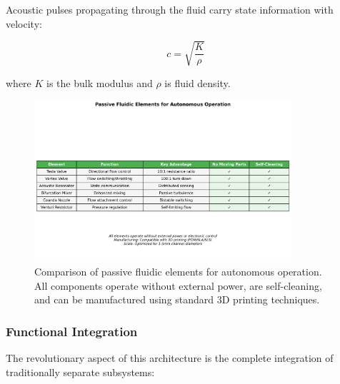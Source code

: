Acoustic pulses propagating through the fluid carry state information with velocity:

\begin{equation}
    c = \sqrt{\frac{K}{\rho}}
\end{equation}

where $K$ is the bulk modulus and $\rho$ is fluid density.

\begin{figure}[H]
    \centering
    \includegraphics[width=0.85\textwidth]{figures/simulations/fluidic_elements_table.png}
    \caption{Comparison of passive fluidic elements for autonomous operation. All components operate without external power, are self-cleaning, and can be manufactured using standard 3D printing techniques.}
    \label{fig:fluidic_table}
\end{figure}

\subsubsection{Functional Integration}

The revolutionary aspect of this architecture is the complete integration of traditionally separate subsystems:

